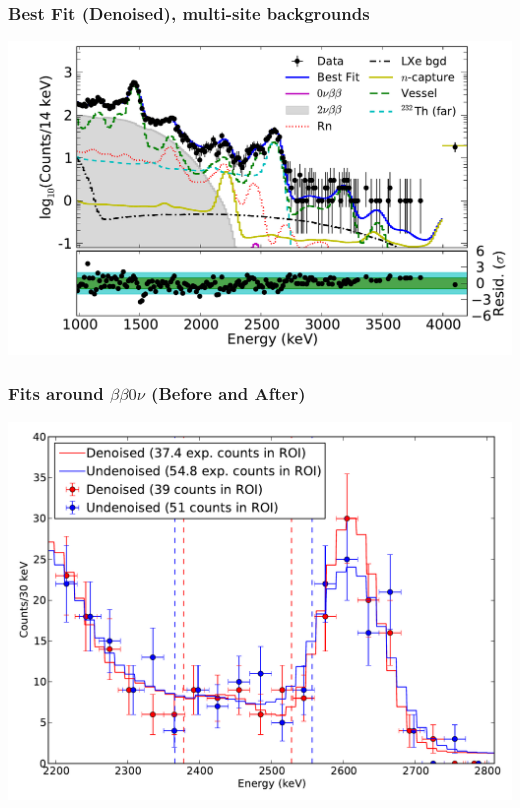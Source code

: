 \documentclass{beamer}
\begin{document}
\begin{frame}
\begin{center}
\frametitle{Best Fit (Denoised), multi-site backgrounds}
\end{center}
\vspace{0.6cm}
\begin{center}
\includegraphics[keepaspectratio=true,width=\textwidth,clip=true,trim=14mm 0mm 0mm 0mm]{Energy_BestFit_ms.pdf}
\end{center}
\end{frame}

\begin{frame}
\begin{center}
\frametitle{Fits around $\beta \beta 0\nu$ (Before and After)}
\end{center}
\vspace{0.6cm}
\begin{center}
\includegraphics[keepaspectratio=true,width=\textwidth]{DenoisedVsUndenoised_TotalPdfsWithData.pdf}
\end{center}
\end{frame}
\end{document}
